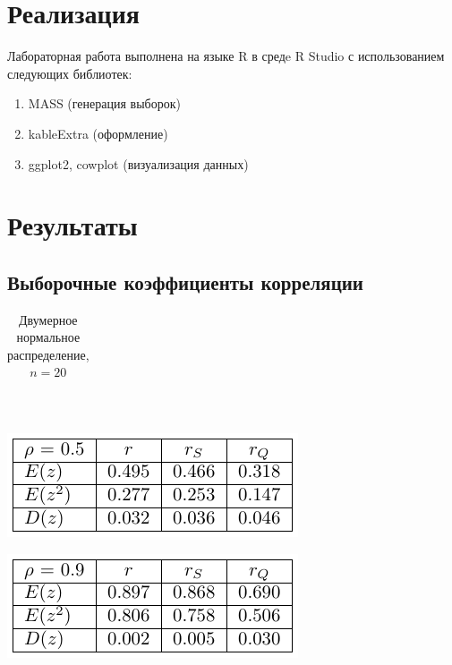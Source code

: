 \documentclass[a4paper]{article}
\begin{document}
\section{Реализация}
Лабораторная работа выполнена на языке R в средe R Studio с использованием следующих библиотек:
\begin{enumerate}
        \item MASS (генерация выборок)
        \item kableExtra (оформление)
        \item ggplot2, cowplot (визуализация данных)
\end{enumerate}
\section{Результаты}
\subsection{Выборочные коэффициенты корреляции}
\begin{table}[H]
    \centering
    \begin{tabular}{|l|c|c|c|}
    \hline 
    
    \end{tabular}\\
    \begin{center}
        \includegraphics[]{LabSrcs/resources/20rho0.5.pdf}
    \end{center}
    \begin{center}
        \includegraphics{LabSrcs/resources/20rho0.9.pdf}
    \end{center}
    \caption{Двумерное нормальное распределение, $n=20$}
    \label{tab:norm20}
\end{table}
\end{document}
